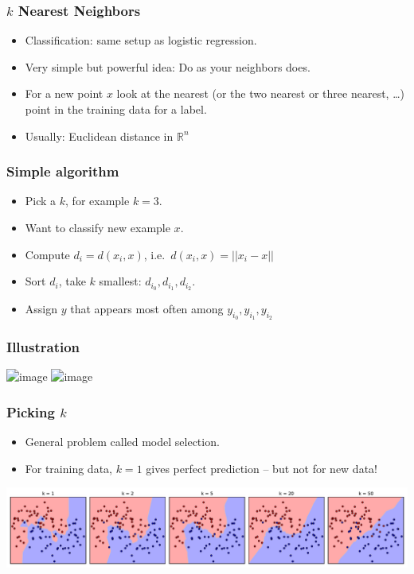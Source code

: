 \begin{frame}
    \frametitle{$k$ Nearest Neighbors}
    \begin{itemize}
        \item Classification: same setup as logistic regression.
        \item Very simple but powerful idea: Do as your neighbors does.
        \item For a new point $x$ look at the nearest (or the two nearest or three nearest, \ldots)
            point in the training data for a label.
        \item Usually: Euclidean distance in $\mathbb{R}^n$
    \end{itemize}
\end{frame}

\begin{frame}
    \frametitle{Simple algorithm}
    \begin{itemize}
        \item Pick a $k$, for example $k=3$.
        \item Want to classify new example $x$.
        \item Compute $d_i = d(x_i, x)$, i.e.\, $d(x_i, x) = ||x_i - x||$
        \item Sort $d_i$, take $k$ smallest: $d_{i_0}, d_{i_1}, d_{i_2}$.
        \item Assign $y$ that appears most often among $y_{i_0}, y_{i_1}, y_{i_2}$
    \end{itemize}
\end{frame}

\begin{frame}
    \frametitle{Illustration}
    \begin{center}
    \includegraphics<1>[width=.6\linewidth]{knn-pics/two_moons}
    \includegraphics<2>[width=.6\linewidth]{knn-pics/two_moons_k=5}
    \end{center}
\end{frame}

\begin{frame}
    \frametitle{Picking $k$}
    \begin{itemize}
        \item General problem called model selection.
        \item For training data, $k=1$ gives perfect prediction -- but not for new data!
    \end{itemize}
    \includegraphics[width=.98\linewidth]{knn-pics/two_moons_varying_k}
\end{frame}


